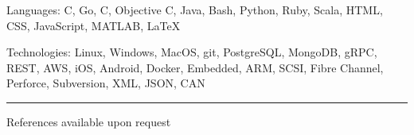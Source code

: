 \documentclass[11pt,letterpaper]{article}
\newenvironment{indentsection}[1]%
{\begin{list}{}%
	{\setlength{\leftmargin}{#1}}%
	\item[]%
}
{\end{list}}
\newcommand{\CPP}
{C\nolinebreak[4]\hspace{-.05em}\raisebox{.22ex}{\footnotesize\bf ++}}
\begin{document}
\begin{indentsection}{\parindent}
\begin{description*}
	\item[Languages:]
	\CPP, Go, C, Objective C, Java, Bash, Python, Ruby, Scala, HTML, CSS, JavaScript, MATLAB, \LaTeX
    \vspace{0.4em}
	\item[Technologies:]
	Linux, Windows, MacOS, git, PostgreSQL, MongoDB, gRPC, REST, AWS, iOS, Android, Docker, Embedded, ARM, SCSI, Fibre Channel, Perforce, Subversion, XML, JSON, CAN
\end{description*}


\vspace{0.6em}
\hrule
\vspace{0.4em}
References available upon request
\end{indentsection}
\end{document}
